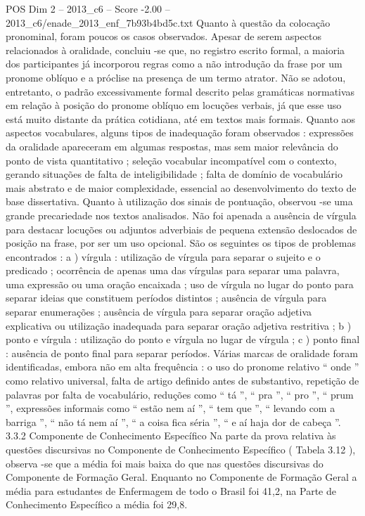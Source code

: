 \begin{textsample}{POS Dim 2 – 2013\_c6 – Score -2.00 – 2013\_c6/enade\_2013\_enf\_7b93b4bd5c.txt}
Quanto à questão da colocação pronominal, foram poucos os casos observados.
Apesar de serem aspectos relacionados à oralidade, concluiu -se que, no registro escrito formal, a maioria dos participantes já incorporou regras como a não introdução da frase por um pronome oblíquo e a próclise na presença de um termo atrator.
Não se adotou, entretanto, o padrão excessivamente formal descrito pelas gramáticas normativas em relação à posição do pronome oblíquo em locuções verbais, já que esse uso está muito distante da prática cotidiana, até em textos mais formais.
Quanto aos aspectos vocabulares, alguns tipos de inadequação foram observados : expressões da oralidade apareceram em algumas respostas, mas sem maior relevância do ponto de vista quantitativo ; seleção vocabular incompatível com o contexto, gerando situações de falta de inteligibilidade ; falta de domínio de vocabulário mais abstrato e de maior complexidade, essencial ao desenvolvimento do texto de base dissertativa.
Quanto à utilização dos sinais de pontuação, observou -se uma grande precariedade nos textos analisados.
Não foi apenada a ausência de vírgula para destacar locuções ou adjuntos adverbiais de pequena extensão deslocados de posição na frase, por ser um uso opcional.
São os seguintes os tipos de problemas encontrados : a ) vírgula : utilização de vírgula para separar o sujeito e o predicado ; ocorrência de apenas uma das vírgulas para separar uma palavra, uma expressão ou uma oração encaixada ; uso de vírgula no lugar do ponto para separar ideias que constituem períodos distintos ; ausência de vírgula para separar enumerações ; ausência de vírgula para separar oração adjetiva explicativa ou utilização inadequada para separar oração adjetiva restritiva ; b ) ponto e vírgula : utilização do ponto e vírgula no lugar de vírgula ; c ) ponto final : ausência de ponto final para separar períodos.
Várias marcas de oralidade foram identificadas, embora não em alta frequência : o uso do pronome relativo “ onde ” como relativo universal, falta de artigo definido antes de substantivo, repetição de palavras por falta de vocabulário, reduções como “ tá ”, “ pra ”, “ pro ”, “ prum ”, expressões informais como “ estão nem aí ”, “ tem que ”, “ levando com a barriga ”, “ não tá nem aí ”, “ a coisa fica séria ”, “ e aí haja dor de cabeça ”. 3.3.2 Componente de Conhecimento Específico Na parte da prova relativa às questões discursivas no Componente de Conhecimento Específico ( Tabela 3.12 ), observa -se que a média foi mais baixa do que nas questões discursivas do Componente de Formação Geral.
Enquanto no Componente de Formação Geral a média para estudantes de Enfermagem de todo o Brasil foi 41,2, na Parte de Conhecimento Específico a média foi 29,8.

\end{textsample}
